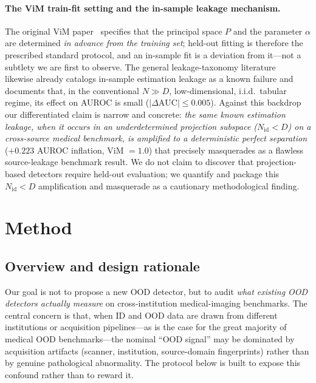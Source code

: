 \documentclass{article}
\begin{document}
\paragraph{The ViM train-fit setting and the in-sample leakage mechanism.} The
original ViM paper~\citep{wang2022vim} specifies that the principal space $P$ and
the parameter $\alpha$ are determined \emph{in advance from the training set};
held-out fitting is therefore the prescribed standard protocol, and an in-sample
fit is a deviation from it---not a subtlety we are first to observe. The general
leakage-taxonomy literature~\citep{roth2026leakage} likewise already catalogs
in-sample estimation leakage as a known failure and documents that, in the
conventional $N \gg D$, low-dimensional, i.i.d.\ tabular regime, its effect on
AUROC is small ($|\Delta\text{AUC}| \le 0.005$). Against this backdrop our
differentiated claim is narrow and concrete: \emph{the same known estimation
leakage, when it occurs in an underdetermined projection subspace
($N_\text{id} < D$) on a cross-source medical benchmark, is amplified to a
deterministic perfect separation} ($+0.223$ AUROC inflation, ViM $=1.0$) that
precisely masquerades as a flawless source-leakage benchmark result. We do not
claim to discover that projection-based detectors require held-out
evaluation; we quantify and package this $N_\text{id} < D$ amplification and
masquerade as a cautionary methodological finding.

\section{Method}

\subsection{Overview and design rationale}

Our goal is not to propose a new OOD detector, but to audit \emph{what existing
OOD detectors actually measure} on cross-institution medical-imaging benchmarks.
The central concern is that, when ID and OOD data are drawn from different
institutions or acquisition pipelines---as is the case for the great majority of
medical OOD benchmarks---the nominal ``OOD signal'' may be dominated by
acquisition artifacts (scanner, institution, source-domain fingerprints) rather
than by genuine pathological abnormality. The protocol below is built to expose
this confound rather than to reward it.
\end{document}
